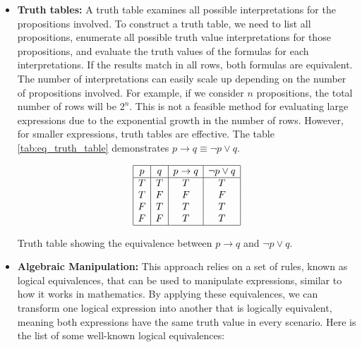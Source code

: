 \begin{itemize}
    \item \textbf{Truth tables:} A truth table examines all possible interpretations for the propositions involved. To construct a truth table, we need to list all propositions, enumerate all possible truth value interpretations for those propositions, and evaluate the truth values of the formulas for each interpretations. If the results match in all rows, both formulas are equivalent. The number of interpretations can easily scale up depending on the number of propositions involved. For example, if we consider \( n \) propositions, the total number of rows will be \( 2^n \). This is not a feasible method for evaluating large expressions due to the exponential growth in the number of rows. However, for smaller expressions, truth tables are effective. The table \ref{tab:eq_truth_table} demonstrates \( p \to q \equiv \lnot p \lor q \).
   \begin{table}[h]
            \centering
            \[
            \begin{array}{|c|c|c|c|}
            \hline
            p & q & p \to q & \lnot p \lor q \\ 
            \hline
            T & T & T & T \\ 
            T & F & F & F \\ 
            F & T & T & T \\ 
            F & F & T & T \\ 
            \hline
            \end{array}
            \]
            \caption{Truth table showing the equivalence between \(p \to q\) and \(\lnot p \lor q\).}
            \label{tab:eq_truth_table}
            \end{table}     

    \item \textbf{Algebraic Manipulation:} This approach relies on a set of rules, known as logical equivalences, that can be used to manipulate expressions, similar to how it works in mathematics. By applying these equivalences, we can transform one logical expression into another that is logically equivalent, meaning both expressions have the same truth value in every scenario. Here is the list of some well-known logical equivalences: 
    

\end{itemize}
